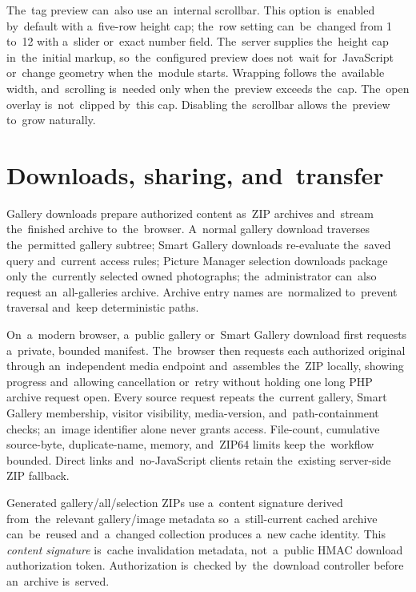 \documentclass[11pt,a4paper]{article}
\begin{document}
The~tag preview can~also use an~internal scrollbar. This option is~enabled
by~default with a~five-row height cap; the~row setting can~be~changed from 1
to~12 with a~slider or~exact number field. The~server supplies the~height cap
in~the~initial markup, so~the~configured preview does not~wait for~JavaScript
or~change geometry when the~module starts. Wrapping follows the~available width,
and~scrolling is~needed only when the~preview exceeds the~cap. The~open overlay
is~not~clipped by~this cap. Disabling the~scrollbar allows the~preview to~grow
naturally.



\section{Downloads, sharing, and~transfer}
\label{sec:sharing}

Gallery downloads prepare authorized content as~ZIP archives and~stream
the~finished archive to~the~browser. A~normal gallery download traverses
the~permitted gallery subtree; Smart Gallery downloads re-evaluate the~saved
query and~current access rules; Picture Manager selection downloads package only
the~currently selected owned photographs; the~administrator can~also request
an~all-galleries archive. Archive entry names are~normalized to~prevent
traversal and~keep deterministic paths.

On~a~modern browser, a~public gallery or~Smart Gallery download first requests
a~private, bounded manifest. The~browser then requests each authorized original
through an~independent media endpoint and~assembles the~ZIP locally, showing
progress and~allowing cancellation or~retry without holding one long PHP archive
request open. Every source request repeats the~current gallery, Smart Gallery
membership, visitor visibility, media-version, and~path-containment checks;
an~image identifier alone never grants access. File-count, cumulative
source-byte, duplicate-name, memory, and~ZIP64 limits keep the~workflow bounded.
Direct links and~no-JavaScript clients retain the~existing server-side ZIP
fallback.

Generated gallery/all/selection ZIPs use a~content signature derived
from~the~relevant gallery/image metadata so~a~still-current cached archive
can~be~reused and~a~changed collection produces a~new cache identity. This
\emph{content signature} is~cache invalidation metadata, not~a~public HMAC
download authorization token. Authorization is~checked by~the~download
controller before an~archive is~served.
\end{document}
